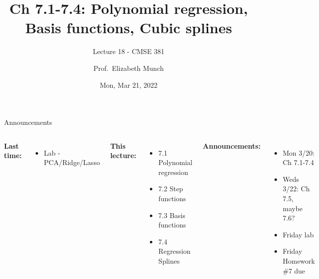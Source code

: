\documentclass[aspectratio=169,usenames,dvipsnames]{beamer}
\begin{document}
\title[]{Ch 7.1-7.4: Polynomial regression, Basis functions, Cubic splines}
\subtitle{Lecture 18 - CMSE 381}
\date{Mon, Mar 21, 2022}



\author[Dr.~Munch]{Prof.~Elizabeth Munch}

\begin{frame}
 \titlepage


\end{frame}
\begin{frame}[c]{Announcements}

\begin{columns}
\centering

	\textbf{Last time:}
	\begin{itemize}
		\item Lab - PCA/Ridge/Lasso
	\end{itemize}

	\vspace{.2in}

	\textbf{This lecture:}
	\begin{itemize}
	\item 7.1 Polynomial regression
	\item 7.2 Step functions
	\item 7.3 Basis functions
	\item 7.4 Regression Splines
\end{itemize}


\centering

\textbf{Announcements:}
	\begin{itemize}
		\item Mon 3/20: Ch 7.1-7.4
		\item Weds 3/22: Ch 7.5, maybe 7.6?
		\item Friday lab
		\item Friday Homework \#7 due

	\end{itemize}
\end{columns}

\end{frame}



\end{document}
